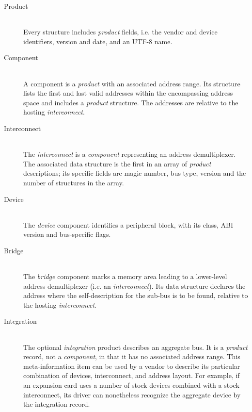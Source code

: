 \documentclass[a4paper, 12pt]{article}
\begin{document}
\begin{description}
\item[Product] \hfill \\
Every structure includes \textit{product} fields, i.e.
the vendor and device identifiers, version and date, and an UTF-8
name.

\item[Component] \hfill \\
A component is a \textit{product} with an associated address range. Its
structure lists the first and last valid addresses within
the encompassing address space and includes a \textit{product}
structure. The addresses are relative to the hosting \textit{interconnect}.

\item[Interconnect] \hfill \\
The \textit{interconnect} is a \textit{component} representing an address demultiplexer.
The associated data structure is the first in an array of \textit{product} descriptions;
its specific fields are magic number, bus type, version and the number of
structures in the array.

\item[Device] \hfill \\
The \textit{device} component identifies a peripheral block, with
its class, ABI version and bus-specific flags.

\item[Bridge] \hfill \\
The \textit{bridge} component marks a memory area leading to a lower-level
address demultiplexer (i.e. an \textit{interconnect}). Its data
structure declares the address where the self-description for the
sub-bus is to be found, relative to the hosting \textit{interconnect}.

\item[Integration] \hfill \\
The optional \textit{integration} product describes an aggregate bus.
It is a \textit{product} record, not a
\textit{component}, in that it has no associated address range. This
meta-information item can be used by a vendor to describe
its particular combination of devices, interconnect, and address layout.
For example, if an expansion card uses a number of stock devices
combined with a stock interconnect, its driver can nonetheless recognize
the aggregate device by the integration record.

\end{description}
\end{document}
